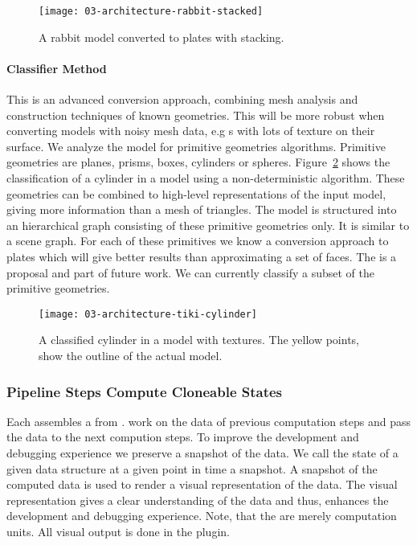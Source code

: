 \documentclass[../../ClassicThesis.tex]{subfiles}
\begin{document}
\begin{figure}[h]
  \centering
  \texttt{[image: 03-architecture-rabbit-stacked]}
  \caption{A rabbit model converted to plates with
    stacking.}
  \label{fig:stacked-rabbit}
\end{figure}

\paragraph{Classifier Method}

This is an advanced conversion approach, combining mesh
analysis and construction techniques of known geometries.
This \class{\fabmethod} will be more robust when converting
models with noisy mesh data, e.g {\threedmodel}s with lots
of texture on their surface. We analyze the model for
primitive geometries algorithms. Primitive geometries are
planes, prisms, boxes, cylinders or spheres.
Figure~\ref{fig:tiki-cylinder} shows the classification of a
cylinder in a model using a non-deterministic algorithm.
These geometries can be combined to high-level
representations of the input model, giving more information
than a mesh of triangles. The model is structured into an
hierarchical graph consisting of these primitive geometries
only. It is similar to a scene graph. For each of these
primitives we know a conversion approach to plates which
will give better results than approximating a set of faces.
The  is a proposal and part of
future work. We can currently classify a subset of the
primitive geometries.

\begin{figure}[h]
  \centering
  \texttt{[image: 03-architecture-tiki-cylinder]}
  \caption{A classified cylinder in a model with textures.
    The yellow points, show the outline of the actual model.}
  \label{fig:tiki-cylinder}
\end{figure}

\subsubsection{Pipeline Steps Compute Cloneable States}

Each \class{\fabmethod} assembles a  from
.  work on the
data of previous computation steps and pass the data to the
next compution steps. To improve the development and
debugging experience we preserve a snapshot of the data. We
call the state of a given data structure at a given point in
time a snapshot. A snapshot of the computed data is used to
render a visual representation of the data. The visual
representation gives a clear understanding of the data and
thus, enhances the development and debugging experience.
Note, that the  are merely computation
units. All visual output is done in the
 plugin.
\end{document}
